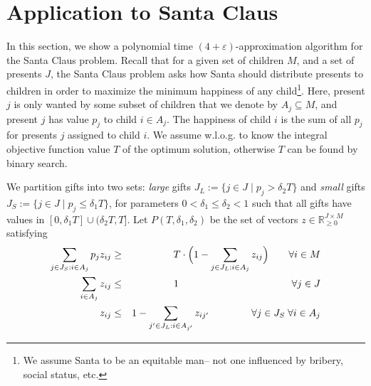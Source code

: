 


\section{Application to Santa Claus\label{sec:SantaClausApplication}}

In this section, we show a polynomial time $(4+\varepsilon)$-approximation algorithm
for the Santa Claus problem. Recall that 
for a given set of children $M$, and a set of presents $J$, the Santa Claus problem asks how Santa should distribute presents to children in order to maximize the minimum happiness of any child\footnote{We assume Santa to be an equitable man-- not one influenced by bribery, social status, etc.}.
Here, present $j$ is only wanted by some subset of children that we denote by $A_j \subseteq M$, and present $j$ has value $p_{j}$ to child $i \in A_j$. The happiness of child $i$ is the sum of all $p_{j}$ for presents $j$ assigned to child $i$. 
We assume w.l.o.g. to know the integral objective function value $T$ of the optimum solution,
otherwise $T$ can be found by binary search.

We partition gifts into two sets: \emph{large} gifts $J_L := \{ j \in J \mid p_j > \delta_2 T\}$
and \emph{small} gifts $J_S := \{ j \in J \mid p_j \leq \delta_1 T\}$,
for parameters $0 < \delta_1 \leq \delta_2 < 1$ such that
all gifts have values in $[0,\delta_1  T] \cup (\delta_2  T,T]$. 
Let $P(T,\delta_1,\delta_2)$ be the set of vectors $z \in \mathbb{R}_{\geq 0}^{J \times M}$ satisfying
\begin{eqnarray*}\label{eq:CompactLPforSC}
 \sum\limits_{j \in J_S: i \in A_j} p_j z_{ij} &\geq& T \cdot \Big( 1-\sum_{j \in J_L: i \in A_j} z_{ij}\Big)  \qquad \forall i \in M \\
  \sum\limits_{i \in A_j}z_{ij} &\leq& 1 \hspace{4.0cm} \forall j \in J \\
  z_{ij} &\leq& 1-\sum_{j' \in J_L: i \in A_{j'}} z_{ij'} \hspace{1.5cm} \forall j \in J_S \; \forall i \in A_j
\end{eqnarray*}

